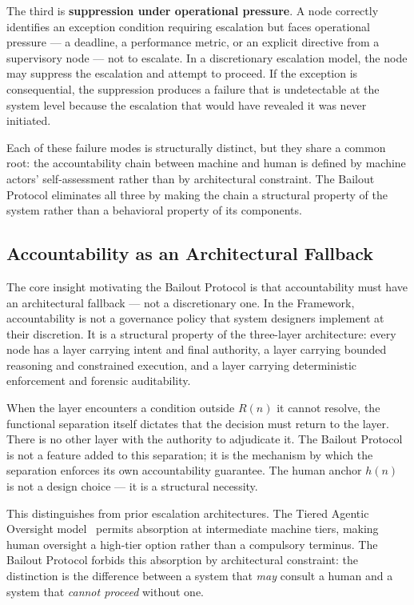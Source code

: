 The third is \textbf{suppression under operational pressure}. A node correctly identifies an exception condition requiring escalation but faces operational pressure --- a deadline, a performance metric, or an explicit directive from a supervisory node --- not to escalate. In a discretionary escalation model, the node may suppress the escalation and attempt to proceed. If the exception is consequential, the suppression produces a failure that is undetectable at the system level because the escalation that would have revealed it was never initiated.

Each of these failure modes is structurally distinct, but they share a common root: the accountability chain between machine and human is defined by machine actors' self-assessment rather than by architectural constraint. The Bailout Protocol eliminates all three by making the chain a structural property of the system rather than a behavioral property of its components.

\subsection{Accountability as an Architectural Fallback}

The core insight motivating the Bailout Protocol is that accountability must have an architectural fallback --- not a discretionary one. In the \bxthree{} Framework, accountability is not a governance policy that system designers implement at their discretion. It is a structural property of the three-layer architecture: every node has a \purpose{} layer carrying intent and final authority, a \bounds{} layer carrying bounded reasoning and constrained execution, and a \fact{} layer carrying deterministic enforcement and forensic auditability.

When the \bounds{} layer encounters a condition outside $R(n)$ it cannot resolve, the functional separation itself dictates that the decision must return to the \purpose{} layer. There is no other layer with the authority to adjudicate it. The Bailout Protocol is not a feature added to this separation; it is the mechanism by which the separation enforces its own accountability guarantee. The human anchor $h(n)$ is not a design choice --- it is a structural necessity.

This distinguishes \bxthree{} from prior escalation architectures. The Tiered Agentic Oversight model~\cite{kim2025tao} permits absorption at intermediate machine tiers, making human oversight a high-tier option rather than a compulsory terminus. The Bailout Protocol forbids this absorption by architectural constraint: the distinction is the difference between a system that \emph{may} consult a human and a system that \emph{cannot proceed} without one.

